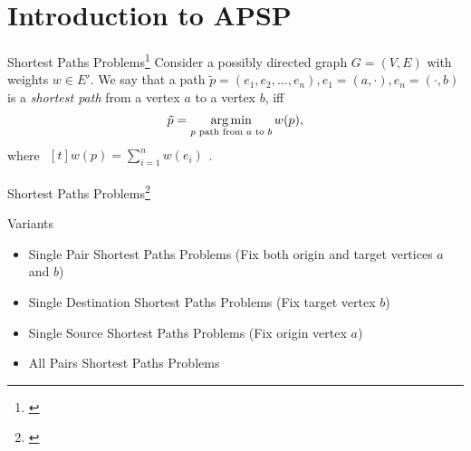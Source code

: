 \section{Introduction to APSP}

\begin{frame}{Shortest Paths Problems\footnote{\cite[Section~24]{Cormen2001}}}
    Consider a possibly directed graph $G = (V, E)$ with weights $w \in E'$.
    We say that a path $\tilde{p} = (e_1, e_2, \dots, e_n), e_1 = (a, \cdot), e_n = (\cdot, b)$ is a \emph{shortest path} from a vertex $a$ to a vertex $b$, iff
    \[
        \tilde{p} = \operatorname*{arg\,min}\limits_{p\text{ path from }a\text{ to }b} w(p),
    \]
    where $\begin{aligned}[t]w(p) = \sum\limits_{i = 1}^n w(e_i)\end{aligned}$.
\end{frame}

\begin{frame}{Shortest Paths Problems\footnote{\cite[Section~24]{Cormen2001}}}
    \begin{alertblock}{Variants}
        \begin{itemize}
            \item<1-> Single Pair Shortest Paths Problems (Fix both origin and target vertices $a$ and $b$)
            \item<2-> Single Destination Shortest Paths Problems (Fix target vertex $b$)
            \item<3-> Single Source Shortest Paths Problems (Fix origin vertex $a$)
            \item<4-> All Pairs Shortest Paths Problems
        \end{itemize}
    \end{alertblock}
\end{frame}

